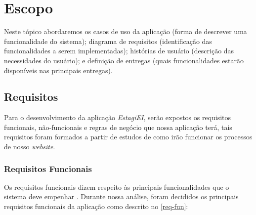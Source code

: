 \section{Escopo}

Neste tópico abordaremos os casos de uso da aplicação (forma de descrever uma funcionalidade do sistema); diagrama de requisitos (identificação das funcionalidades a serem implementadas); histórias de usuário (descrição das necessidades do usuário); e definição de entregas (quais funcionalidades estarão disponíveis nas principais entregas).
\subsection{Requisitos}

Para o desenvolvimento da aplicação \emph{EstagiEI}, serão expostos os requisitos funcionais, não-funcionais e regras de negócio que nossa aplicação terá, tais requisitos foram formados a partir de estudos de como irão funcionar os processos de nosso \emph{website}.

\subsubsection{Requisitos Funcionais}

Os requisitos funcionais dizem respeito às principais funcionalidades que o sistema deve empenhar \cite{sommerville}. Durante nossa análise, foram decididos os principais requisitos funcionais da aplicação como descrito no \autoref{req-fun}:

